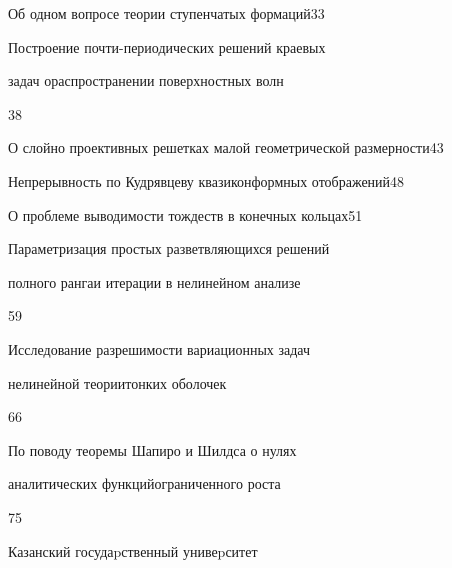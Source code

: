 

{Об одном вопросе теории ступенчатых формаций}{33}




{Построение почти-периодических решений краевых  


задач о\newline распространении поверхностных волн}{38}




{О слойно проективных решетках малой геометрической размерности}{43}




{Непрерывность по Кудрявцеву квазиконформных отображений}{48}




{О проблеме выводимости тождеств в конечных кольцах}{51}




{Параметризация простых разветвляющихся решений


полного ранга\newline и итерации в нелинейном анализе}{59}




{Исследование разрешимости вариационных задач 


нелинейной теории\newline тонких оболочек}{66}




{По поводу теоремы Шапиро и Шилдса о нулях  


аналитических функций\newline ограниченного роста}{75}











\vfill


\noindent\raisebox{2pt}{\copyright} Казанский госудаpственный унивеpситет





